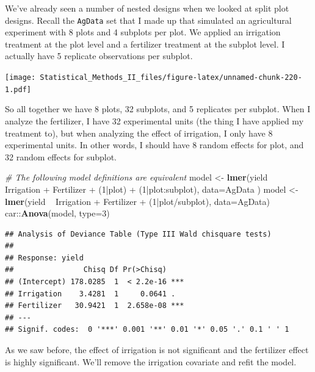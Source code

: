 \documentclass[]{book}
\newenvironment{Shaded}{\begin{snugshade}}{\end{snugshade}}
\newcommand{\KeywordTok}[1]{\textcolor[rgb]{0.13,0.29,0.53}{\textbf{{#1}}}}
\newcommand{\DataTypeTok}[1]{\textcolor[rgb]{0.13,0.29,0.53}{{#1}}}
\newcommand{\DecValTok}[1]{\textcolor[rgb]{0.00,0.00,0.81}{{#1}}}
\newcommand{\StringTok}[1]{\textcolor[rgb]{0.31,0.60,0.02}{{#1}}}
\newcommand{\CommentTok}[1]{\textcolor[rgb]{0.56,0.35,0.01}{\textit{{#1}}}}
\newcommand{\NormalTok}[1]{{#1}}
\theoremstyle{definition}
\theoremstyle{definition}
\theoremstyle{remark}
\begin{document}
We've already seen a number of nested designs when we looked at split
plot designs. Recall the \texttt{AgData} set that I made up that
simulated an agricultural experiment with 8 plots and 4 subplots per
plot. We applied an irrigation treatment at the plot level and a
fertilizer treatment at the subplot level. I actually have 5 replicate
observations per subplot.

\texttt{[image: Statistical\_Methods\_II\_files/figure-latex/unnamed-chunk-220-1.pdf]}

So all together we have 8 plots, 32 subplots, and 5 replicates per
subplot. When I analyze the fertilizer, I have 32 experimental units
(the thing I have applied my treatment to), but when analyzing the
effect of irrigation, I only have 8 experimental units. In other words,
I should have 8 random effects for plot, and 32 random effects for
subplot.

\begin{Shaded}
\begin{Highlighting}[]
\CommentTok{# The following model definitions are equivalent}
\NormalTok{model <-}\StringTok{ }\KeywordTok{lmer}\NormalTok{(yield ~}\StringTok{ }\NormalTok{Irrigation +}\StringTok{ }\NormalTok{Fertilizer +}\StringTok{ }\NormalTok{(}\DecValTok{1}\NormalTok{|plot) +}\StringTok{ }\NormalTok{(}\DecValTok{1}\NormalTok{|plot:subplot), }\DataTypeTok{data=}\NormalTok{AgData )}
\NormalTok{model <-}\StringTok{ }\KeywordTok{lmer}\NormalTok{(yield ~}\StringTok{ }\NormalTok{Irrigation +}\StringTok{ }\NormalTok{Fertilizer +}\StringTok{ }\NormalTok{(}\DecValTok{1}\NormalTok{|plot/subplot), }\DataTypeTok{data=}\NormalTok{AgData)}
\NormalTok{car::}\KeywordTok{Anova}\NormalTok{(model, }\DataTypeTok{type=}\DecValTok{3}\NormalTok{)}
\end{Highlighting}
\end{Shaded}

\begin{verbatim}
## Analysis of Deviance Table (Type III Wald chisquare tests)
## 
## Response: yield
##                Chisq Df Pr(>Chisq)    
## (Intercept) 178.0285  1  < 2.2e-16 ***
## Irrigation    3.4281  1     0.0641 .  
## Fertilizer   30.9421  1  2.658e-08 ***
## ---
## Signif. codes:  0 '***' 0.001 '**' 0.01 '*' 0.05 '.' 0.1 ' ' 1
\end{verbatim}

As we saw before, the effect of irrigation is not significant and the
fertilizer effect is highly significant. We'll remove the irrigation
covariate and refit the model.
\end{document}
